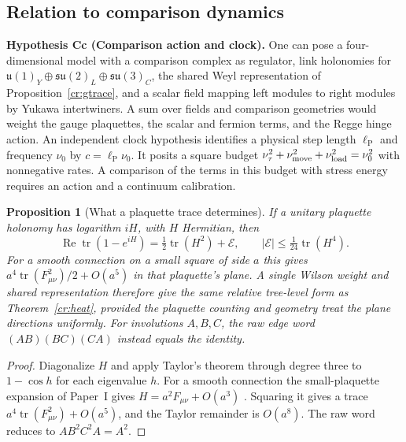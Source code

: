 \documentclass[aps,pra,onecolumn,superscriptaddress,nofootinbib,10pt]{revtex4-2}
\newtheorem{proposition}[theorem]{Proposition}
\theoremstyle{definition}
\theoremstyle{remark}
\begin{document}
\subsection{Relation to comparison dynamics}

\smallskip\noindent\textbf{Hypothesis Cc (Comparison action and clock).}  One can pose a four-dimensional model with a comparison complex
as regulator, link holonomies for
$\mathfrak u(1)_Y\oplus\mathfrak{su}(2)_L\oplus\mathfrak{su}(3)_C$,
the shared Weyl representation of Proposition~\ref{cr:gtrace},
and a scalar field mapping left modules to right modules by
Yukawa intertwiners. A sum over fields and comparison geometries
would weight the gauge plaquettes, the scalar and fermion terms,
and the Regge hinge action. An independent clock hypothesis
identifies a physical step length $\ell_{\mathrm P}$ and
frequency $\nu_0$ by $c=\ell_{\mathrm P}\nu_0$. It posits a square
budget $\nu_\tau^2+\nu_{\rm move}^2+\nu_{\rm load}^2=\nu_0^2$
with nonnegative rates. A comparison of the terms in this budget
with stress energy requires an action and a continuum calibration.


\begin{proposition}[What a plaquette trace determines]\label{cr:plaquette}
If a unitary plaquette holonomy has logarithm $iH$, with $H$
Hermitian, then
\[
 \operatorname{Re}\operatorname{tr}(1-e^{iH})
 =\tfrac12\operatorname{tr}(H^2)+\mathcal E,\qquad
 |\mathcal E|\le \tfrac1{24}\operatorname{tr}(H^4).
\]
For a smooth connection on a small square of side $a$ this gives
$a^4\operatorname{tr}(F_{\mu\nu}^2)/2+O(a^5)$ in that
plaquette's plane. A single Wilson weight and shared representation
therefore give the same relative tree-level form as
Theorem~\ref{cr:heat}, provided the plaquette counting and geometry
treat the plane directions uniformly. For involutions $A,B,C$,
the raw edge word $(AB)(BC)(CA)$ instead equals the identity.
\end{proposition}
\begin{proof}
Diagonalize $H$ and apply Taylor's theorem through degree three
to $1-\cos h$ for each eigenvalue $h$. For a smooth connection the
small-plaquette expansion of Paper~I gives
$H=a^2 F_{\mu\nu}+O(a^3)$ \cite[Prop.~9.8]{PaperI}. Squaring it gives a trace
$a^4\operatorname{tr}(F_{\mu\nu}^2)+O(a^5)$, and the Taylor
remainder is $O(a^8)$. The raw word reduces to $AB^2C^2A=A^2$.
\end{proof}
\end{document}
